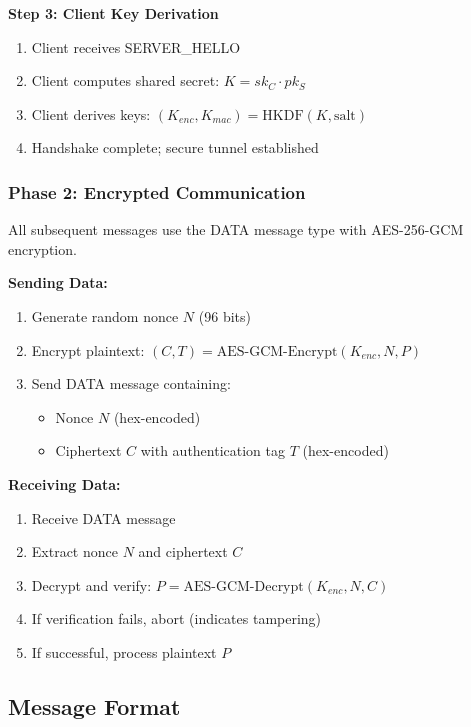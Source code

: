 \documentclass[12pt,a4paper]{article}
\begin{document}
\textbf{Step 3: Client Key Derivation}
\begin{enumerate}
    \item Client receives SERVER\_HELLO
    \item Client computes shared secret: $K = sk_C \cdot pk_S$
    \item Client derives keys: $(K_{enc}, K_{mac}) = \text{HKDF}(K, \text{salt})$
    \item Handshake complete; secure tunnel established
\end{enumerate}

\subsubsection{Phase 2: Encrypted Communication}

All subsequent messages use the DATA message type with AES-256-GCM encryption.

\textbf{Sending Data:}
\begin{enumerate}
    \item Generate random nonce $N$ (96 bits)
    \item Encrypt plaintext: $(C, T) = \text{AES-GCM-Encrypt}(K_{enc}, N, P)$
    \item Send DATA message containing:
    \begin{itemize}
        \item Nonce $N$ (hex-encoded)
        \item Ciphertext $C$ with authentication tag $T$ (hex-encoded)
    \end{itemize}
\end{enumerate}

\textbf{Receiving Data:}
\begin{enumerate}
    \item Receive DATA message
    \item Extract nonce $N$ and ciphertext $C$
    \item Decrypt and verify: $P = \text{AES-GCM-Decrypt}(K_{enc}, N, C)$
    \item If verification fails, abort (indicates tampering)
    \item If successful, process plaintext $P$
\end{enumerate}

\subsection{Message Format}
\end{document}
